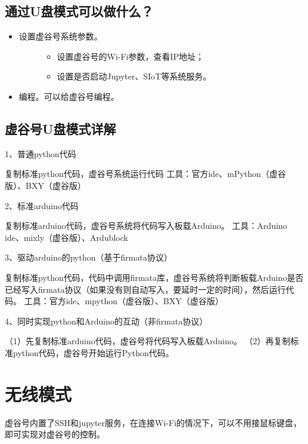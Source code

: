\documentclass[letterpaper,10pt,english]{sphinxmanual}
\begin{document}
\subsection{通过U盘模式可以做什么？}
\label{\detokenize{02.quick/2.1-dap:id2}}\begin{itemize}
\item {} \begin{description}
\item[{设置虚谷号系统参数。}] \leavevmode\begin{itemize}
\item {} 
设置虚谷号的Wi-Fi参数，查看IP地址；

\item {} 
设置是否启动Jupyter、SIoT等系统服务。

\end{itemize}

\end{description}

\item {} 
编程。可以给虚谷号编程。

\end{itemize}


\subsection{虚谷号U盘模式详解}
\label{\detokenize{02.quick/2.1-dap:id3}}
1、普通python代码

复制标准python代码，虚谷号系统运行代码
工具：官方ide、mPython（虚谷版）、BXY（虚谷版）

2、标准arduino代码

复制标准arduino代码，虚谷号系统将代码写入板载Arduino。
工具：Arduino ide、mixly（虚谷版）、Ardublock

3、驱动arduino的python（基于firmata协议）

复制标准python代码，代码中调用firmata库，虚谷号系统将判断板载Arduino是否已经写入firmata协议（如果没有则自动写入，要延时一定的时间），然后运行代码。
工具：官方ide、mpython（虚谷版）、BXY（虚谷版）

4、同时实现python和Arduino的互动（非firmata协议）

（1）先复制标准arduino代码，虚谷号将代码写入板载Arduino。
（2）再复制标准python代码，虚谷号开始运行Python代码。


\section{无线模式}
\label{\detokenize{02.quick/2.2-wifi::doc}}\label{\detokenize{02.quick/2.2-wifi:id1}}
虚谷号内置了SSH和jupyter服务，在连接Wi-Fi的情况下，可以不用接鼠标键盘，即可实现对虚谷号的控制。
\end{document}
